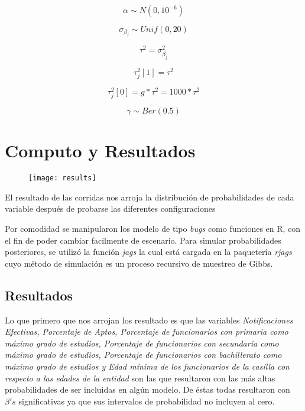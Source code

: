\documentclass[DIV=calc, 
					paper=letter, 
					fontsize=11pt, 
					twocolumn]{scrartcl}
\begin{document}
\begin{equation*}
\alpha \sim N(0,10^{-6})
\end{equation*}

\begin{equation*}
\sigma_{\beta_j} \sim Unif(0,20)
\end{equation*}

\begin{equation*}
\tau^{2} = \sigma_{\beta_j}^{2}
\end{equation*}


\begin{equation*}
\tau_{j}^{2}{[1]} = \tau^{2}
\end{equation*}

\begin{equation*}
\tau_{j}^{2}{[0]} = g*\tau^{2}=1000*\tau^{2}
\end{equation*}

\begin{equation*}
\gamma \sim Ber(0.5)
\end{equation*}

\section{Computo y Resultados}
\label{S:3}

\begin{figure}[H]
\caption{}
\centering
\texttt{[image: results]}
\end{figure}

El resultado de las corridas nos arroja la distribuci\'on de probabilidades de cada variable despu\'es de probarse las diferentes configuraciones

Por comodidad se manipularon los modelo de tipo \textit{bugs} como funciones en R, con el fin de poder cambiar facilmente de escenario. Para simular probabilidades posteriores, se utiliz\'o la funci\'on \textit{jags} la cual est\'a cargada en la paqueter\'ia \textit{rjags} cuyo m\'etodo de simulaci\'on es un proceso recursivo de muestreo de Gibbs.\\

\subsection{Resultados}
\vspace{3mm}
Lo que primero que nos arrojan los resultado es que las variables \textit{Notificaciones Efectivas, Porcentaje de Aptos, Porcentaje de funcionarios con primaria como m\'aximo grado de estudios, Porcentaje de funcionarios con secundaria como m\'aximo grado de estudios, Porcentaje de funcionarios con bachillerato como m\'aximo grado de estudios y Edad m\'inima de los funcionarios de la casilla con respecto a las edades de la entidad} son las que resultaron con las m\'as altas probabilidades de ser incluidas en alg\'un modelo. De \'estas todas resultaron con $\beta{'s}$ significativas ya que sus intervalos de probabilidad no incluyen al cero.
\end{document}
